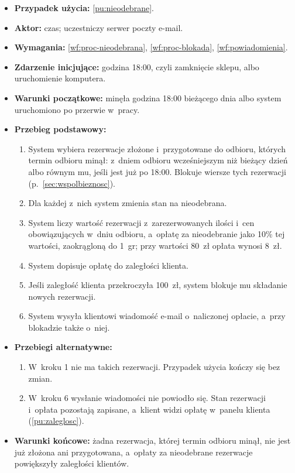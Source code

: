 \documentclass[12pt,a4paper,oneside]{article}
\newcounter{pu}
\begin{document}
\begin{itemize}
	\item \textbf{Przypadek użycia:} \ref{pu:nieodebrane}.
	\item \textbf{Aktor:} czas; uczestniczy serwer poczty e-mail.
	\item \textbf{Wymagania:} \ref{wf:proc-nieodebrana}, \ref{wf:proc-blokada}, \ref{wf:powiadomienia}.
	\item \textbf{Zdarzenie inicjujące:} godzina 18:00, czyli zamknięcie sklepu, albo uruchomienie komputera.
	\item \textbf{Warunki początkowe:} minęła godzina 18:00 bieżącego dnia albo system uruchomiono po przerwie w~pracy.
	\item \textbf{Przebieg podstawowy:}
	\begin{enumerate}
		\item System wybiera rezerwacje złożone i~przygotowane do odbioru, których termin odbioru minął: z~dniem odbioru wcześniejszym niż bieżący dzień albo równym mu, jeśli jest już po 18:00. Blokuje wiersze tych rezerwacji (p.~\ref{sec:wspolbieznosc}).
		\item Dla każdej z~nich system zmienia stan na nieodebrana.
		\item System liczy wartość rezerwacji z~zarezerwowanych ilości i~cen obowiązujących w~dniu odbioru, a~opłatę za nieodebranie jako 10\% tej wartości, zaokrągloną do 1~gr; przy wartości 80~zł opłata wynosi 8~zł.
		\item System dopisuje opłatę do zaległości klienta.
		\item Jeśli zaległość klienta przekroczyła 100~zł, system blokuje mu składanie nowych rezerwacji.
		\item System wysyła klientowi wiadomość e-mail o~naliczonej opłacie, a~przy blokadzie także o~niej.
	\end{enumerate}
	\item \textbf{Przebiegi alternatywne:}
	\begin{enumerate}[label=A\arabic*.]
		\item W~kroku 1 nie ma takich rezerwacji. Przypadek użycia kończy się bez zmian.
		\item W~kroku 6 wysłanie wiadomości nie powiodło się. Stan rezerwacji i~opłata pozostają zapisane, a~klient widzi opłatę w~panelu klienta (\ref{pu:zaleglosc}).
	\end{enumerate}
	\item \textbf{Warunki końcowe:} żadna rezerwacja, której termin odbioru minął, nie jest już złożona ani przygotowana, a~opłaty za nieodebrane rezerwacje powiększyły zaległości klientów.
\end{itemize}
\end{document}
